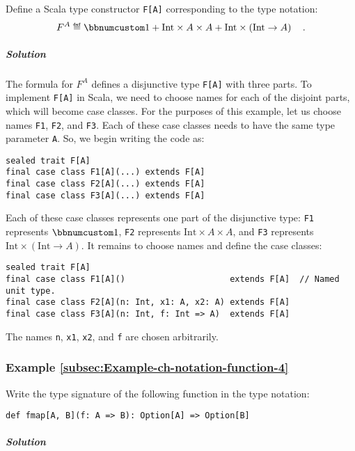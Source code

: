 Define a Scala type constructor \lstinline!F[A]! corresponding to
the type notation:
\[
F^{A}\triangleq\bbnum 1+\text{Int}\times A\times A+\text{Int}\times\left(\text{Int}\rightarrow A\right)\quad.
\]


\subparagraph{Solution}

The formula for $F^{A}$ defines a disjunctive type \lstinline!F[A]!
with three parts. To implement \lstinline!F[A]! in Scala, we need
to choose names for each of the disjoint parts, which will become
case classes. For the purposes of this example, let us choose names
\lstinline!F1!, \lstinline!F2!, and \lstinline!F3!. Each of these
case classes needs to have the same type parameter \lstinline!A!.
So, we begin writing the code as:
\begin{lstlisting}
sealed trait F[A]
final case class F1[A](...) extends F[A]
final case class F2[A](...) extends F[A]
final case class F3[A](...) extends F[A]
\end{lstlisting}
Each of these case classes represents one part of the disjunctive
type: \lstinline!F1! represents $\bbnum 1$, \lstinline!F2! represents
$\text{Int}\times A\times A$, and \lstinline!F3! represents $\text{Int}\times\left(\text{Int}\rightarrow A\right)$.
It remains to choose names and define the case classes:
\begin{lstlisting}
sealed trait F[A]
final case class F1[A]()                     extends F[A]  // Named unit type.
final case class F2[A](n: Int, x1: A, x2: A) extends F[A]
final case class F3[A](n: Int, f: Int => A)  extends F[A]
\end{lstlisting}
The names \lstinline!n!, \lstinline!x1!, \lstinline!x2!, and \lstinline!f!
are chosen arbitrarily.

\subsubsection{Example \label{subsec:Example-ch-notation-function-4}\ref{subsec:Example-ch-notation-function-4}}

Write the type signature of the following function in the type notation:
\begin{lstlisting}
def fmap[A, B](f: A => B): Option[A] => Option[B]
\end{lstlisting}


\subparagraph{Solution}

